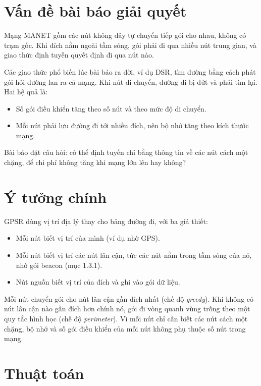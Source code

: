 \documentclass[a4paper,13pt]{extreport}
\begin{document}
\section{Vấn đề bài báo giải quyết}

Mạng MANET gồm các nút không dây tự chuyển tiếp gói cho nhau, không có trạm gốc. Khi đích nằm ngoài tầm sóng, gói phải đi qua nhiều nút trung gian, và giao thức định tuyến quyết định đi qua nút nào.

Các giao thức phổ biến lúc bài báo ra đời, ví dụ DSR, tìm đường bằng cách phát gói hỏi đường lan ra cả mạng. Khi nút di chuyển, đường đi bị đứt và phải tìm lại. Hai hệ quả là:
\begin{itemize}
  \item Số gói điều khiển tăng theo số nút và theo mức độ di chuyển.
  \item Mỗi nút phải lưu đường đi tới nhiều đích, nên bộ nhớ tăng theo kích thước mạng.
\end{itemize}

Bài báo đặt câu hỏi: có thể định tuyến chỉ bằng thông tin về các nút cách một chặng, để chi phí không tăng khi mạng lớn lên hay không?

\section{Ý tưởng chính}

GPSR dùng vị trí địa lý thay cho bảng đường đi, với ba giả thiết:
\begin{itemize}
  \item Mỗi nút biết vị trí của mình (ví dụ nhờ GPS).
  \item Mỗi nút biết vị trí các nút lân cận, tức các nút nằm trong tầm sóng của nó, nhờ gói beacon (mục 1.3.1).
  \item Nút nguồn biết vị trí của đích và ghi vào gói dữ liệu.
\end{itemize}

Mỗi nút chuyển gói cho nút lân cận gần đích nhất (chế độ \textit{greedy}). Khi không có nút lân cận nào gần đích hơn chính nó, gói đi vòng quanh vùng trống theo một quy tắc hình học (chế độ \textit{perimeter}). Vì mỗi nút chỉ cần biết các nút cách một chặng, bộ nhớ và số gói điều khiển của mỗi nút không phụ thuộc số nút trong mạng.

\section{Thuật toán}
\end{document}
